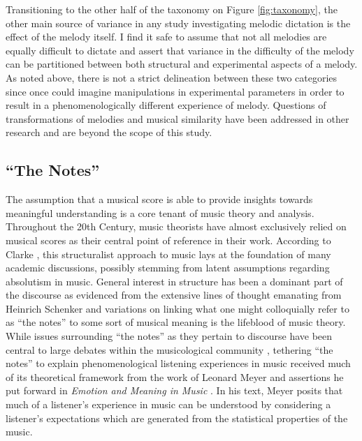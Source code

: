 \documentclass[12pt,]{book}
\begin{document}
Transitioning to the other half of the taxonomy on Figure \ref{fig:taxonomy}, the other main source of variance in any study investigating melodic dictation is the effect of the melody itself.
I find it safe to assume that not all melodies are equally difficult to dictate and assert that variance in the difficulty of the melody can be partitioned between both structural and experimental aspects of a melody.
As noted above, there is not a strict delineation between these two categories since once could imagine manipulations in experimental parameters in order to result in a phenomenologically different experience of melody.
Questions of transformations of melodies and musical similarity have been addressed in other research \citep{cambouropoulosHowSimilarSimilar2009, wigginsModelsMusicalSimilarity2007} and are beyond the scope of this study.

\hypertarget{the-notes}{%
\subsection{``The Notes''}\label{the-notes}}

The assumption that a musical score is able to provide insights towards meaningful understanding is a core tenant of music theory and analysis.
Throughout the 20th Century, music theorists have almost exclusively relied on musical scores as their central point of reference in their work.
According to Clarke \citep{clarkeWaysListeningEcological2005}, this structuralist approach to music lays at the foundation of many academic discussions, possibly stemming from latent assumptions regarding absolutism in music.
General interest in structure has been a dominant part of the discourse as evidenced from the extensive lines of thought emanating from Heinrich Schenker \citep{schenkerFreieSatz1935, salzerStructuralHearingTonal1982, schachterSchenkerStudies2006, schenkerSchenkerStudies1990} and variations on linking what one might colloquially refer to as ``the notes'' to some sort of musical meaning is the lifeblood of music theory.
While issues surrounding ``the notes'' as they pertain to discourse have been central to large debates within the musicological community \citep{agawuHowWeGot2004, kermanContemplatingMusicChallenges1986}, tethering ``the notes'' to explain phenomenological listening experiences in music received much of its theoretical framework from the work of Leonard Meyer and assertions he put forward in \emph{Emotion and Meaning in Music} \citep{meyerEmotionMeaningMusic1956}.
In his text, Meyer posits that much of a listener's experience in music can be understood by considering a listener's expectations which are generated from the statistical properties of the music.
\end{document}
